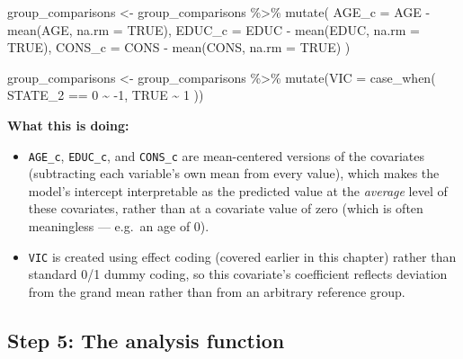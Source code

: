 \documentclass[
  letterpaper,
  DIV=11,
  numbers=noendperiod]{scrreprt}
\newenvironment{Shaded}{\begin{snugshade}}{\end{snugshade}}
\newcommand{\AttributeTok}[1]{\textcolor[rgb]{0.40,0.45,0.13}{#1}}
\newcommand{\ConstantTok}[1]{\textcolor[rgb]{0.56,0.35,0.01}{#1}}
\newcommand{\DecValTok}[1]{\textcolor[rgb]{0.68,0.00,0.00}{#1}}
\newcommand{\FunctionTok}[1]{\textcolor[rgb]{0.28,0.35,0.67}{#1}}
\newcommand{\NormalTok}[1]{\textcolor[rgb]{0.00,0.23,0.31}{#1}}
\newcommand{\OtherTok}[1]{\textcolor[rgb]{0.00,0.23,0.31}{#1}}
\newcommand{\SpecialCharTok}[1]{\textcolor[rgb]{0.37,0.37,0.37}{#1}}
\begin{document}
\begin{Shaded}
\begin{Highlighting}[]
\NormalTok{group\_comparisons }\OtherTok{\textless{}{-}}\NormalTok{ group\_comparisons }\SpecialCharTok{\%\textgreater{}\%}
  \FunctionTok{mutate}\NormalTok{(}
    \AttributeTok{AGE\_c  =}\NormalTok{ AGE  }\SpecialCharTok{{-}} \FunctionTok{mean}\NormalTok{(AGE,  }\AttributeTok{na.rm =} \ConstantTok{TRUE}\NormalTok{),}
    \AttributeTok{EDUC\_c =}\NormalTok{ EDUC }\SpecialCharTok{{-}} \FunctionTok{mean}\NormalTok{(EDUC, }\AttributeTok{na.rm =} \ConstantTok{TRUE}\NormalTok{),}
    \AttributeTok{CONS\_c =}\NormalTok{ CONS }\SpecialCharTok{{-}} \FunctionTok{mean}\NormalTok{(CONS, }\AttributeTok{na.rm =} \ConstantTok{TRUE}\NormalTok{)}
\NormalTok{  )}

\NormalTok{group\_comparisons }\OtherTok{\textless{}{-}}\NormalTok{ group\_comparisons }\SpecialCharTok{\%\textgreater{}\%}
  \FunctionTok{mutate}\NormalTok{(}\AttributeTok{VIC =} \FunctionTok{case\_when}\NormalTok{(}
\NormalTok{    STATE\_2 }\SpecialCharTok{==} \DecValTok{0} \SpecialCharTok{\textasciitilde{}} \SpecialCharTok{{-}}\DecValTok{1}\NormalTok{,}
    \ConstantTok{TRUE} \SpecialCharTok{\textasciitilde{}} \DecValTok{1}
\NormalTok{  ))}
\end{Highlighting}
\end{Shaded}

\textbf{What this is doing:}

\begin{itemize}
\item
  \texttt{AGE\_c}, \texttt{EDUC\_c}, and \texttt{CONS\_c} are
  mean-centered versions of the covariates (subtracting each variable's
  own mean from every value), which makes the model's intercept
  interpretable as the predicted value at the \emph{average} level of
  these covariates, rather than at a covariate value of zero (which is
  often meaningless --- e.g.~an age of 0).
\item
  \texttt{VIC} is created using effect coding (covered earlier in this
  chapter) rather than standard 0/1 dummy coding, so this covariate's
  coefficient reflects deviation from the grand mean rather than from an
  arbitrary reference group.
\end{itemize}

\subsection{Step 5: The analysis
function}\label{step-5-the-analysis-function}
\end{document}
